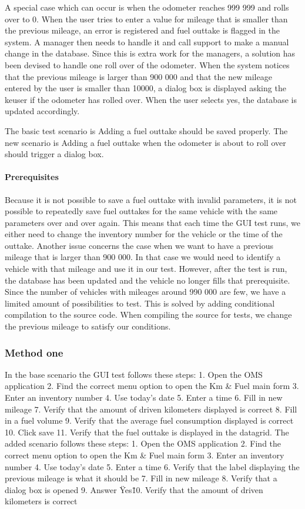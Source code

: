 \documentclass{article}
\begin{document}
		A special case which can occur is when the odometer reaches 999 999 and rolls over to 0. When the user tries to enter a value for mileage that is smaller than the previous mileage, an error is registered and fuel outtake is flagged in the system. A manager then needs to handle it and call support to make a manual change in the database.
		Since this is extra work for the managers, a solution has been devised to handle one roll over of the odometer. When the system notices that the previous mileage is larger than 900 000 and that the new mileage entered by the user is smaller than 10000, a dialog box is displayed asking the keuser if the odometer has rolled over. When the user selects yes, the database is updated accordingly.

		The basic test scenario is Adding a fuel outtake should be saved properly.
		The new scenario is Adding a fuel outtake when the odometer is about to roll over should trigger a dialog box.

		\paragraph{Prerequisites}
		Because it is not possible to save a fuel outtake with invalid parameters, it is not possible to repeatedly save fuel outtakes for the same vehicle with the same parameters over and over again.
		This means that each time the GUI test runs, we either need to change the inventory number for the vehicle or the time of the outtake.
		Another issue concerns the case when we want to have a previous mileage that is larger than 900 000. In that case we would need to identify a vehicle with that mileage and use it in our test.
		However, after the test is run, the database has been updated and the vehicle no longer fills that prerequisite. Since the number of vehicles with mileages around 990 000 are few, we have a limited amount of possibilities to test.
		This is solved by adding conditional compilation to the source code. When compiling the source for tests, we change the previous mileage to satisfy our conditions.




			\subsubsection{Method one}
In the base scenario the GUI test follows these steps:
1. Open the OMS application
2. Find the correct menu option to open the Km \& Fuel main form
3. Enter an inventory number
4. Use today's date
5. Enter a time
6. Fill in new mileage
7. Verify that the amount of driven kilometers displayed is correct
8. Fill in a fuel volume
9. Verify that the average fuel consumption displayed is correct
10. Click save
11. Verify that the fuel outtake is displayed in the datagrid.
The added scenario follows these steps:
1. Open the OMS application
2. Find the correct menu option to open the Km \& Fuel main form
3. Enter an inventory number
4. Use today's date
5. Enter a time
6. Verify that the label displaying the previous mileage is what it should be
7. Fill in new mileage
8. Verify that a dialog box is opened
9. Answer \"Yes\"
10. Verify that the amount of driven kilometers is correct
\end{document}
